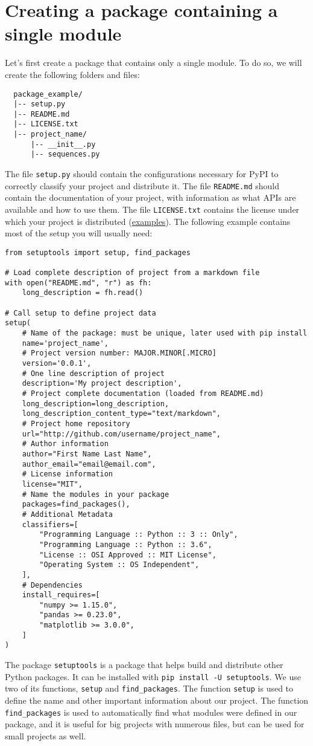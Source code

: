 \documentclass[12pt, a4paper]{article}
\begin{document}
\section*{Creating a package containing a single module}
\label{sec:org8c1a1c9}
Let's first create a package that contains only a single module.
To do so, we will create the following folders and files:
\lstset{language=bash,label= ,caption= ,captionpos=b,numbers=none}
\begin{lstlisting}
  package_example/
  |-- setup.py
  |-- README.md
  |-- LICENSE.txt
  |-- project_name/
      |-- __init__.py
      |-- sequences.py
\end{lstlisting}
The file \texttt{setup.py} should contain the configurations necessary for PyPI to correctly classify your project and distribute it.
The file \texttt{README.md} should contain the documentation of your project, with information as what APIs are available and how to use them.
The file \texttt{LICENSE.txt} contains the license under which your project is distributed (\href{https://choosealicense.com}{examples}).
The following example contains most of the setup you will usually need:
\lstset{language=jupyter-python,label= ,caption= ,captionpos=b,numbers=none}
\begin{lstlisting}
from setuptools import setup, find_packages

# Load complete description of project from a markdown file
with open("README.md", "r") as fh:
    long_description = fh.read()

# Call setup to define project data
setup(
    # Name of the package: must be unique, later used with pip install
    name='project_name',
    # Project version number: MAJOR.MINOR[.MICRO]
    version='0.0.1',
    # One line description of project
    description='My project description',
    # Project complete documentation (loaded from README.md)
    long_description=long_description,
    long_description_content_type="text/markdown",
    # Project home repository
    url="http://github.com/username/project_name",
    # Author information
    author="First Name Last Name",
    author_email="email@email.com",
    # License information
    license="MIT",
    # Name the modules in your package
    packages=find_packages(),
    # Additional Metadata
    classifiers=[
        "Programming Language :: Python :: 3 :: Only",
        "Programming Language :: Python :: 3.6",
        "License :: OSI Approved :: MIT License",
        "Operating System :: OS Independent",
    ],
    # Dependencies
    install_requires=[
        "numpy >= 1.15.0",
        "pandas >= 0.23.0",
        "matplotlib >= 3.0.0",
    ]
)
\end{lstlisting}
The package \texttt{setuptools} is a package that helps build and distribute other Python packages.
It can be installed with \texttt{pip install -U setuptools}.
We use two of its functions, \texttt{setup} and \texttt{find\_packages}.
The function \texttt{setup} is used to define the name and other important information about our project.
The function \texttt{find\_packages} is used to automatically find what modules were defined in our package, and it is useful for big projects with numerous files, but can be used for small projects as well.
\end{document}
